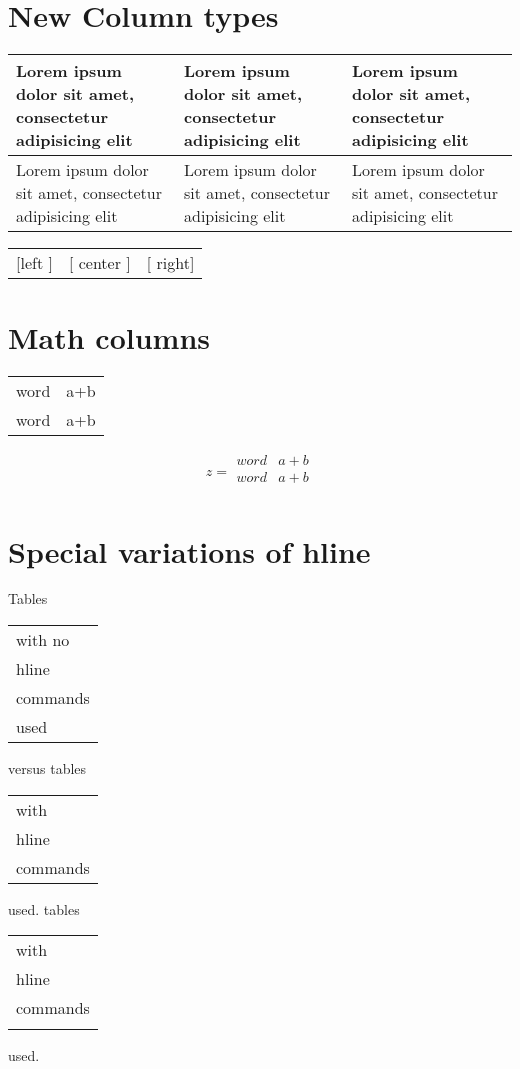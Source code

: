 \documentclass{article}
\begin{document}
\section{New Column types}
\begin{tabular}{|p{1in}|m{1in}|b{1in}|}\hline
Lorem ipsum dolor sit amet, consectetur adipisicing elit &
Lorem ipsum dolor sit amet, consectetur adipisicing elit &
Lorem ipsum dolor sit amet, consectetur adipisicing elit \\\hline
Lorem ipsum dolor sit amet, consectetur adipisicing elit &
Lorem ipsum dolor sit amet, consectetur adipisicing elit &
Lorem ipsum dolor sit amet, consectetur adipisicing elit \\
\hline
\end{tabular}
\begin{tabular}{|>{[}l<{]}|>{[}c<{]}|>{[}r<{]}|}
left & center & right\\
\end{tabular}
\section{Math columns}
\begin{tabular}{cC}
word & a+b \\
word & a+b \\
\end{tabular}
\begin{equation}
z=
\begin{array}{Cc}
word & a+b \\
word & a+b \\
\end{array}
\end{equation}
\section{Special variations of hline}
Tables
\begin{tabular}[t]{l}
with no\\ hline \\ commands \\ used
\end{tabular} versus
tables
\begin{tabular}[t]{|l|}
\hline
with\\ hline \\ commands \\ 
\hline
\end{tabular} used.
tables
\begin{tabular}[t]{|l|}
\firsthline
with\\ hline \\ commands \\ 
\lasthline
\end{tabular} used.
\end{document}
